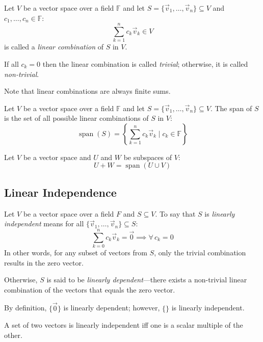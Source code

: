 \documentclass[letterpaper,12pt,fleqn]{article}
\DeclareMathOperator{\spn}{span}
\newcommand{\vv}{\vec{v}}
\newcommand{\vz}{\vec{0}}
\newcommand{\F}{\mathbb{F}}
\begin{document}
\begin{definition}
  Let $V$ be a vector space over a field $\F$ and let
  $S=\{\vv_1,\ldots,\vv_n\}\subseteq V$ and $c_1,\ldots,c_n\in\F$:
  \[\sum_{k=1}^nc_k\vv_k\in V\]
  is called a \emph{linear combination} of $S$ in $V$.

  If all $c_k=0$ then the linear combination is called \emph{trivial}; otherwise, it is
  called \emph{non-trivial}.

  Note that linear combinations are always finite sums.
\end{definition}

\begin{theorem}
  Let $V$ be a vector space over a field $\F$ and let
  $S=\{\vv_1,\ldots,\vv_n\}\subseteq V$. The span of $S$ is the set of all possible
  linear combinations of $S$ in $V$:
  \[\spn(S)=\left\{\sum_{k=1}^nc_k\vv_k\mid c_k\in\F\right\}\]
\end{theorem}

\begin{theorem}
  Let $V$ be a vector space and $U$ and $W$ be subspaces of $V$:
  \[U+W=\spn(U\cup V)\]
\end{theorem}

\newpage

\subsection*{Linear Independence}

\begin{definition}
  Let $V$ be a vector space over a field $F$ and $S\subseteq V$. To say that $S$ is
  \emph{linearly independent} means for all $\{\vv_1,\ldots,\vv_n\}\subseteq S$:
  \[\sum_{k=0}^nc_k\vv_k=\vz\implies\forall\,c_k=0\]
  In other words, for any subset of vectors from $S$, only the trivial combination
  results in the zero vector.

  Otherwise, $S$ is said to be \emph{linearly dependent}---there exists a non-trivial
  linear combination of the vectors that equals the zero vector.

  By definition, $\{\vz\}$ is linearly dependent; however, $\{\}$ is linearly independent.
\end{definition}

\begin{theorem}
  A set of two vectors is linearly independent iff one is a scalar multiple of the other.
\end{theorem}
\end{document}
